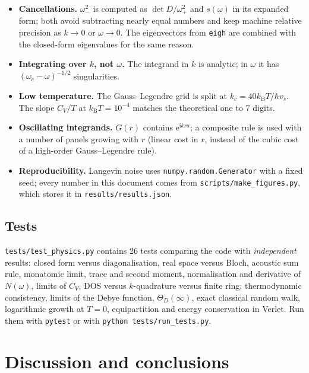 \documentclass[11pt,a4paper]{article}
\newcommand{\kB}{k_{\mathrm B}}
\newcommand{\ii}{\mathrm{i}}
\newcommand{\ee}{\mathrm{e}}
\newcommand{\vs}{v_{s}}
\newcommand{\code}[1]{\texttt{#1}}
\begin{document}
\begin{itemize}
\item \textbf{Cancellations.} $\omega_-^2$ is computed as $\det D/\omega_+^2$ and
  $s(\omega)$ in its expanded form; both avoid subtracting nearly equal numbers
  and keep machine relative precision as $k\to0$ or $\omega\to0$. The
  eigenvectors from \code{eigh} are combined with the closed-form eigenvalues
  for the same reason.
\item \textbf{Integrating over $k$, not $\omega$.} The integrand in $k$ is
  analytic; in $\omega$ it has $(\omega_c-\omega)^{-1/2}$ singularities.
\item \textbf{Low temperature.} The Gauss–Legendre grid is split at
  $k_c=40\kB T/\hbar\vs$. The slope $C_V/T$ at $\kB T=10^{-4}$ matches the
  theoretical one to $7$ digits.
\item \textbf{Oscillating integrands.} $G(r)$ contains $\ee^{\ii kra}$; a
  composite rule is used with a number of panels growing with $r$ (linear cost in
  $r$, instead of the cubic cost of a high-order Gauss–Legendre rule).
\item \textbf{Reproducibility.} Langevin noise uses \code{numpy.random.Generator}
  with a fixed seed; every number in this document comes from
  \code{scripts/make\_figures.py}, which stores it in
  \code{results/results.json}.
\end{itemize}

\subsection{Tests}

\code{tests/test\_physics.py} contains 26 tests comparing the code with
\emph{independent} results: closed form versus diagonalisation, real space
versus Bloch, acoustic sum rule, monatomic limit, trace and second moment,
normalisation and derivative of $N(\omega)$, limits of $C_V$, DOS versus
$k$-quadrature versus finite ring, thermodynamic consistency, limits of the
Debye function, $\Theta_D(\infty)$, exact classical random walk, logarithmic
growth at $T=0$, equipartition and energy conservation in Verlet. Run them with
\code{pytest} or with \code{python tests/run\_tests.py}.

\section{Discussion and conclusions}
\end{document}
